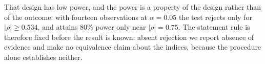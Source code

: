 That design has low power, and the power is a property of the design rather than of the outcome:
with fourteen observations at $\alpha = 0.05$ the test rejects only for $|\rho| \geq 0.534$, and
attains 80\% power only near $|\rho| = 0.75$. The statement rule is therefore fixed before the
result is known: absent rejection we report absence of evidence and make no equivalence claim
about the indices, because the procedure alone establishes neither.
